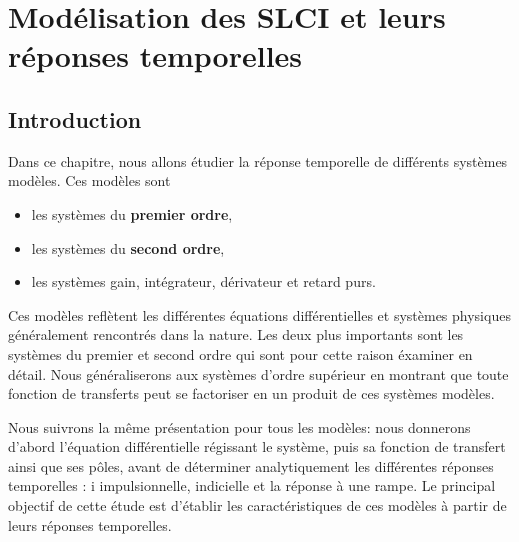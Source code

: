 \chapter[Modélisation des SLCI]
        {Modélisation des SLCI\label{chap-model} et leurs réponses temporelles}
\minitoc
\newpage
\section{Introduction}

Dans ce chapitre, nous allons étudier la réponse 
temporelle de différents systèmes modèles. Ces modèles sont 
\begin{itemize}
    \item les systèmes du \textbf{premier ordre},
    \item les systèmes du \textbf{second ordre},
    \item les systèmes gain, intégrateur, dérivateur et retard purs.
\end{itemize}
Ces modèles reflètent les différentes équations différentielles et 
systèmes physiques généralement rencontrés dans la nature.
Les deux plus importants sont les systèmes du premier et second ordre 
qui sont pour cette raison éxaminer en détail. 
Nous généraliserons aux systèmes d'ordre supérieur en montrant 
que toute fonction de transferts peut se factoriser en un produit
de ces systèmes modèles.

Nous suivrons la même présentation pour tous les modèles: 
nous donnerons d'abord l'équation différentielle régissant le système, puis 
sa fonction de transfert ainsi que ses pôles, avant de 
déterminer analytiquement les différentes réponses temporelles : i
impulsionnelle, indicielle et la réponse à une rampe. 
Le principal objectif de cette étude est d'établir les caractéristiques 
de ces modèles à partir de leurs réponses temporelles.

